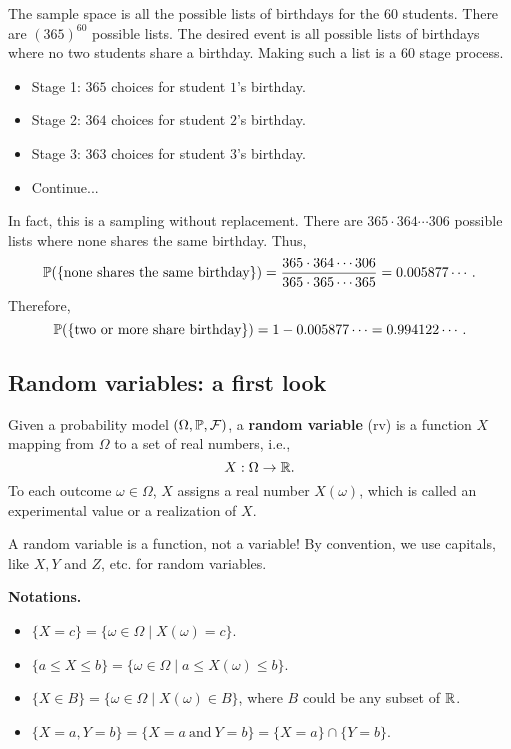   The sample space is all the possible lists of birthdays for the $60$ students.
  There are $(365)^{60}$ possible lists. The desired event is all possible lists
  of birthdays where no two students share a birthday. Making such a list is a
  $60$ stage process.
  \begin{itemize}
  \item Stage 1: $365$ choices for student $1$'s birthday.
  \item Stage 2: $364$ choices for student $2$'s birthday.
  \item Stage 3: $363$ choices for student $3$'s birthday.
  \item Continue...
  \end{itemize}
  In fact, this is a sampling without replacement. There are $365\cdot 364\cdots
  306$ possible lists where none shares the same birthday. Thus,
  \[
    \mathbb{P}(\{\text{none shares the same birthday}\}) = \frac{365\cdot 364\cdots
      306}{365\cdot 365\cdots 365} = 0.005877\cdots.
  \]
  Therefore,
  \[
    \mathbb{P}(\{\text{two or more share birthday}\}) = 1- 0.005877\cdots = 0.994122\cdots.
  \]





  
  \subsection{Random variables: a first look}
  \label{subsec:1.5}
  \begin{definition}
    Given a probability model $(\Omega, \mathbb{P}, \mathcal{F})$, a \textbf{random variable} (rv) is a
   function $X$ mapping from $\Omega$ to a set of real numbers, i.e.,
   \[
     X: \Omega \to \mathbb{R}.
   \]
   To each outcome $\omega\in \Omega$, $X$ assigns a real number $X(\omega)$,
   which is called an experimental value or a realization of $X$.
 \end{definition}
 
  \begin{remark}
   A random variable is a function, not a variable! By convention, we use
   capitals, like $X, Y$  and $Z$, etc. for random variables. 
  \end{remark}
  \textbf{Notations.}
  \begin{itemize}
  \item $\{X = c\} = \{\omega\in \Omega\mid X(\omega) = c\}$.
  \item $\{a\le X\le b\} = \{\omega\in \Omega\mid a\le X(\omega)\le b\}$.
  \item $\{X\in B\} = \{\omega\in \Omega\mid X(\omega)\in B\}$, where $B$ could
    be any subset of $\mathbb{R}$.
  \item $\{X = a, Y = b\} = \{X=a~\text{and}~Y=b\} = \{X=a\}\cap \{Y = b\}$.
  \end{itemize}

